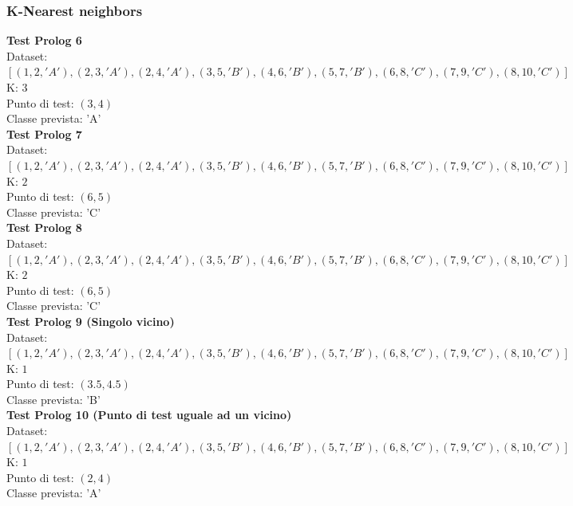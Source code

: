 \documentclass[11pt]{article}
\theoremstyle{definition}
\begin{document}
\subsubsection{K-Nearest neighbors}
\textbf{Test Prolog 6}\\
Dataset: $[(1, 2, 'A'), (2, 3, 'A'), (2, 4, 'A'), (3, 5, 'B'), (4, 6, 'B'), (5, 7, 'B'), (6, 8, 'C'), (7, 9, 'C'), (8, 10, 'C')]$\\
K: $3$\\
Punto di test: $(3, 4)$\\
Classe prevista: 'A'\\
\newline
\textbf{Test Prolog 7}\\
Dataset: $[(1, 2, 'A'), (2, 3, 'A'), (2, 4, 'A'), (3, 5, 'B'), (4, 6, 'B'), (5, 7, 'B'), (6, 8, 'C'), (7, 9, 'C'), (8, 10, 'C')]$\\
K: $2$\\
Punto di test: $(6, 5)$\\
Classe prevista: 'C'\\
\newline
\textbf{Test Prolog 8}\\
Dataset: $[(1, 2, 'A'), (2, 3, 'A'), (2, 4, 'A'), (3, 5, 'B'), (4, 6, 'B'), (5, 7, 'B'), (6, 8, 'C'), (7, 9, 'C'), (8, 10, 'C')]$\\
K: $2$\\
Punto di test: $(6, 5)$\\
Classe prevista: 'C'\\
\newline
\textbf{Test Prolog 9 (Singolo vicino)}\\
Dataset: $[(1, 2, 'A'), (2, 3, 'A'), (2, 4, 'A'), (3, 5, 'B'), (4, 6, 'B'), (5, 7, 'B'), (6, 8, 'C'), (7, 9, 'C'), (8, 10, 'C')]$\\
K: $1$\\
Punto di test: $(3.5, 4.5)$\\
Classe prevista: 'B'\\
\newline
\textbf{Test Prolog 10 (Punto di test uguale ad un vicino)}\\
Dataset: $[(1, 2, 'A'), (2, 3, 'A'), (2, 4, 'A'), (3, 5, 'B'), (4, 6, 'B'), (5, 7, 'B'), (6, 8, 'C'), (7, 9, 'C'), (8, 10, 'C')]$\\
K: $1$\\
Punto di test: $(2, 4)$\\
Classe prevista: 'A'
\end{document}
